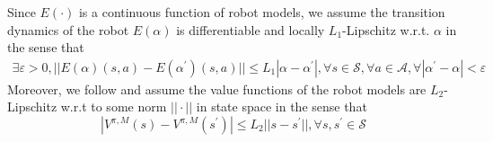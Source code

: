 
Since $E(\cdot)$ is a continuous function of robot models, we assume the transition dynamics of the robot $E(\alpha)$ is differentiable and locally $L_1$-Lipschitz w.r.t. $\alpha$ in the sense that
\begin{equation}\label{eq:alpha:lipschitz:assumption}
\begin{split}
     \exists \varepsilon > 0,
    ||E(\alpha)(s,a) - E(\alpha^\prime)(s,a)|| \le L_1 |\alpha - \alpha^\prime|, 
    \forall s\in\mathcal{S}, \forall a\in\mathcal{A}, \forall |\alpha^\prime - \alpha | < \varepsilon    
\end{split}
\end{equation}
Moreover, we follow \cite{slbo} and assume the value functions of the robot models are $L_2$-Lipschitz w.r.t to some norm $||\cdot||$ in state space in the sense that
\begin{equation}\label{eq:state:lipschitz:assumption}
    |V^{\pi, M}(s) - V^{\pi, M}(s^\prime)| \le L_2 ||s-s^\prime||, \forall s, s^\prime \in \mathcal{S}
\end{equation}


